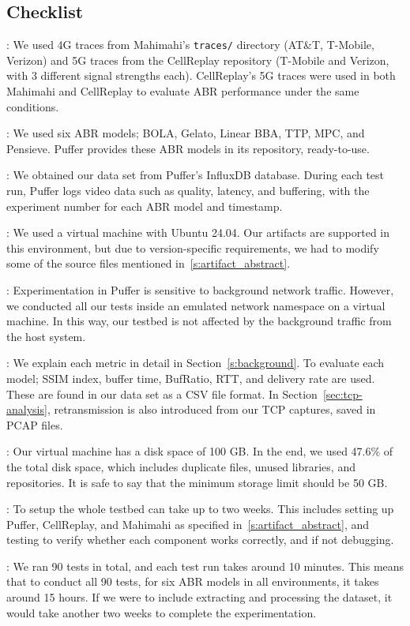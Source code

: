\subsection{Checklist}

:
%
We used 4G traces from Mahimahi’s \texttt{traces/} directory (AT\&T, T-Mobile, Verizon) and 5G traces from the CellReplay repository (T-Mobile and Verizon, with 3 different signal strengths each). CellReplay's 5G traces were used in both Mahimahi and CellReplay to evaluate ABR performance under the same conditions.

:
%
We used six ABR models; BOLA, Gelato, Linear BBA, TTP, MPC, and Pensieve. Puffer provides these ABR models in its repository, ready-to-use.

:
%
We obtained our data set from Puffer's InfluxDB database. During each test run, Puffer logs video data such as quality, latency, and buffering, with the experiment number for each ABR model and timestamp.

:
%
We used a virtual machine with Ubuntu 24.04. Our artifacts are supported in this environment, but due to version-specific requirements, we had to modify some of the source files mentioned in~\ref{s:artifact_abstract}.

:
%
Experimentation in Puffer is sensitive to background network traffic. However, we conducted all our tests inside an emulated network namespace on a virtual machine. In this way, our testbed is not affected by the background traffic from the host system.

:
%
We explain each metric in detail in Section~\ref{s:background}. To evaluate each model; SSIM index, buffer time, BufRatio, RTT, and delivery rate are used. These are found in our data set as a CSV file format. In Section~\ref{sec:tcp-analysis}, retransmission is also introduced from our TCP captures, saved in PCAP files.

:
%
Our virtual machine has a disk space of 100 GB. In the end, we used 47.6\% of the total disk space, which includes duplicate files, unused libraries, and repositories. It is safe to say that the minimum storage limit should be 50 GB.

:
%
To setup the whole testbed can take up to two weeks. This includes setting up Puffer, CellReplay, and Mahimahi as specified in~\ref{s:artifact_abstract}, and testing to verify whether each component works correctly, and if not debugging.

:
%
We ran 90 tests in total, and each test run takes around 10 minutes. This means that to conduct all 90 tests, for six ABR models in all environments, it takes around 15 hours. If we were to include extracting and processing the dataset, it would take another two weeks to complete the experimentation.

